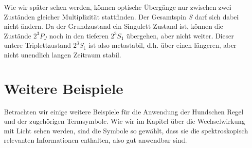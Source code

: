 Wie wir später sehen werden, können optische Übergänge nur zwischen zwei Zuständen gleicher Multiplizität stattfinden. Der Gesamtspin $S$ darf sich dabei nicht ändern. Da der Grundzustand ein Singulett-Zustand ist, können die Zustände $2^3P_J$ noch in den tieferen $2^3S_1$ übergehen, aber nicht weiter. Dieser untere Triplettzustand $2^3S_1$ ist also metastabil, d.h. über einen längeren, aber nicht unendlich langen Zeitraum stabil.


\section{Weitere Beispiele}

Betrachten wir einige weitere Beispiele für die Anwendung der Hundschen Regel und der zugehörigen Termsymbole. Wie wir im Kapitel über die Wechselwirkung mit Licht sehen werden, sind die Symbole so gewählt, dass sie die spektroskopisch relevanten Informationen enthalten, also gut anwendbar sind.

